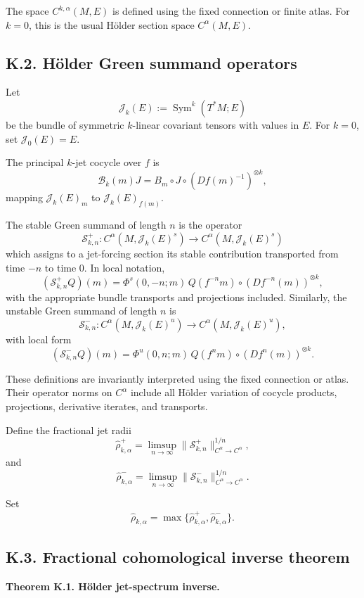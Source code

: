 \documentclass[12pt,a4paper]{article}
\theoremstyle{plain}
\numberwithin{equation}{section}
\numberwithin{theorem}{section}
\begin{document}
The space $C^{k,\alpha}(M,E)$ is defined using the fixed connection or finite atlas. For $k=0$, this is the usual H\"older section space $C^\alpha(M,E)$.

\subsection{K.2. H\"older Green summand operators}

Let
\[
\mathcal J_k(E):=
\operatorname{Sym}^k(T^*M;E)
\]
be the bundle of symmetric $k$-linear covariant tensors with values in $E$. For $k=0$, set $\mathcal J_0(E)=E$.

The principal $k$-jet cocycle over $f$ is
\[
\mathscr B_k(m)J
=
B_m\circ J\circ(Df(m)^{-1})^{\otimes k},
\]
mapping $\mathcal J_k(E)_m$ to $\mathcal J_k(E)_{f(m)}$.

The stable Green summand of length $n$ is the operator
\[
\mathcal S_{k,n}^+:
C^\alpha(M,
\mathcal J_k(E)^s)
\to
C^\alpha(M,
\mathcal J_k(E)^s)
\]
which assigns to a jet-forcing section its stable contribution transported from time $-n$ to time $0$. In local notation,
\[
(\mathcal S_{k,n}^+Q)(m)
=
\Phi^s(0,-n;m)
\,Q(f^{-n}m)
\circ
(Df^{-n}(m))^{\otimes k},
\]
with the appropriate bundle transports and projections included. Similarly, the unstable Green summand of length $n$ is
\[
\mathcal S_{k,n}^-:
C^\alpha(M,
\mathcal J_k(E)^u)
\to
C^\alpha(M,
\mathcal J_k(E)^u),
\]
with local form
\[
(\mathcal S_{k,n}^-Q)(m)
=
\Phi^u(0,n;m)
\,Q(f^n m)
\circ
(Df^{n}(m))^{\otimes k}.
\]

These definitions are invariantly interpreted using the fixed connection or atlas. Their operator norms on $C^\alpha$ include all H\"older variation of cocycle products, projections, derivative iterates, and transports.

Define the fractional jet radii
\[
\widehat\rho_{k,\alpha}^+
=
\limsup_{n\to\infty}
\|\mathcal S_{k,n}^+\|_{C^\alpha\to C^\alpha}^{1/n},
\]
and
\[
\widehat\rho_{k,\alpha}^-
=
\limsup_{n\to\infty}
\|\mathcal S_{k,n}^-\|_{C^\alpha\to C^\alpha}^{1/n}.
\]

Set
\[
\widehat\rho_{k,\alpha}
=
\max\{
\widehat\rho_{k,\alpha}^+,
\widehat\rho_{k,\alpha}^-
\}.
\]

\subsection{K.3. Fractional cohomological inverse theorem}

\textbf{Theorem K.1. H\"older jet-spectrum inverse.}
\end{document}
